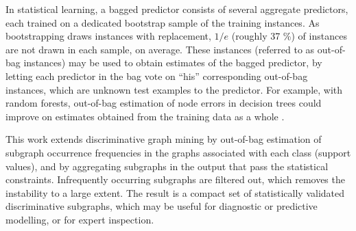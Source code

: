 \documentclass{sig-alternate}
\begin{document}

In statistical learning, a bagged predictor consists of several aggregate
predictors, each trained on a dedicated bootstrap sample of the training
instances. As bootstrapping draws instances with replacement, $1/e$ (roughly 37
\%) of instances are not drawn in each sample, on average. These instances
(referred to as out-of-bag instances) may be used to obtain estimates of the
bagged predictor, by letting each predictor in the bag vote on ``his'' corresponding 
out-of-bag instances, 
which are unknown test examples to the predictor.
For example, with random forests, out-of-bag estimation of node errors in
decision trees could improve on estimates obtained from the training data as a
whole \cite{breiman96oob}.

This work extends discriminative graph mining by out-of-bag estimation of 
subgraph occurrence frequencies in the graphs associated with each class (support values), 
and by aggregating subgraphs in the output that pass the
statistical constraints. Infrequently occurring subgraphs are filtered out, 
which removes the instability to a large extent. 
The result is a compact set of statistically validated
discriminative subgraphs, which may be useful for diagnostic or predictive
modelling, or for expert inspection. 
\end{document}
